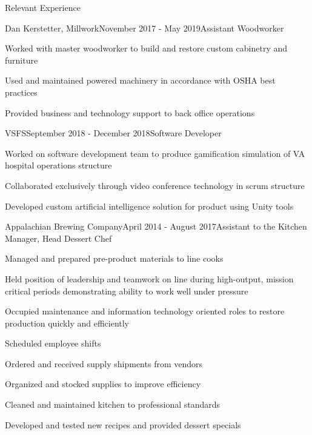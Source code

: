 \documentclass{resume} %
\begin{document}
\begin{rSection}{Relevant Experience}

\begin{rSubsection}{Dan Kerstetter, Millwork}{November 2017 - May 2019}{Assistant Woodworker}{}
\item Worked with master woodworker to build and restore custom cabinetry and furniture
\item Used and maintained powered machinery in accordance with OSHA best practices
\item Provided business and technology support to back office operations
\end{rSubsection}


\begin{rSubsection}{VSFS}{September 2018 - December 2018}{Software Developer}{}
\item Worked on software development team to produce gamification simulation of VA hospital operations structure
\item Collaborated exclusively through video conference technology in scrum structure
\item Developed custom artificial intelligence solution for product using Unity tools
\end{rSubsection}


\begin{rSubsection}{Appalachian Brewing Company}{April 2014 - August 2017}{Assistant to the Kitchen Manager, Head Dessert Chef}{}
\item Managed and prepared pre-product materials to line cooks
\item Held position of leadership and teamwork on line during high-output, mission critical periods demonstrating ability to work well under pressure
\item Occupied maintenance and information technology oriented roles to restore production quickly and efficiently
\item Scheduled employee shifts
\item Ordered and received supply shipments from vendors
\item Organized and stocked supplies to improve efficiency
\item Cleaned and maintained kitchen to professional standards
\item Developed and tested new recipes and provided dessert specials
\end{rSubsection}


\end{rSection}
\end{document}
